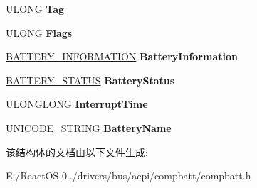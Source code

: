 \begin{DoxyCompactItemize}
\begin{tabbing}
\end{tabbing}\item 
\mbox{\label{struct___c_o_m_p_b_a_t_t___b_a_t_t_e_r_y___d_a_t_a_a3085023fcc6a220cb97306e86a2e1237}} 
U\+L\+O\+NG {\bfseries Tag}
\item 
\mbox{\label{struct___c_o_m_p_b_a_t_t___b_a_t_t_e_r_y___d_a_t_a_a6699e803ca4326297e81cb715efb3ea0}} 
U\+L\+O\+NG {\bfseries Flags}
\item 
\mbox{\label{struct___c_o_m_p_b_a_t_t___b_a_t_t_e_r_y___d_a_t_a_a43d88324e912debfdd30b441788922a2}} 
\hyperlink{struct___b_a_t_t_e_r_y___i_n_f_o_r_m_a_t_i_o_n}{B\+A\+T\+T\+E\+R\+Y\+\_\+\+I\+N\+F\+O\+R\+M\+A\+T\+I\+ON} {\bfseries Battery\+Information}
\item 
\mbox{\label{struct___c_o_m_p_b_a_t_t___b_a_t_t_e_r_y___d_a_t_a_a7c46a146fc5abf85c5748aa54a101adf}} 
\hyperlink{struct___b_a_t_t_e_r_y___s_t_a_t_u_s}{B\+A\+T\+T\+E\+R\+Y\+\_\+\+S\+T\+A\+T\+US} {\bfseries Battery\+Status}
\item 
\mbox{\label{struct___c_o_m_p_b_a_t_t___b_a_t_t_e_r_y___d_a_t_a_ae3284af9949ae5a0af6bb4f5c3cb8bd4}} 
U\+L\+O\+N\+G\+L\+O\+NG {\bfseries Interrupt\+Time}
\item 
\mbox{\label{struct___c_o_m_p_b_a_t_t___b_a_t_t_e_r_y___d_a_t_a_a8fc97bd2c880651fdfbd6454f5529771}} 
\hyperlink{struct___u_n_i_c_o_d_e___s_t_r_i_n_g}{U\+N\+I\+C\+O\+D\+E\+\_\+\+S\+T\+R\+I\+NG} {\bfseries Battery\+Name}
\end{DoxyCompactItemize}


该结构体的文档由以下文件生成\+:\begin{DoxyCompactItemize}
\item 
E\+:/\+React\+O\+S-\/0../drivers/bus/acpi/compbatt/compbatt.\+h\end{DoxyCompactItemize}
